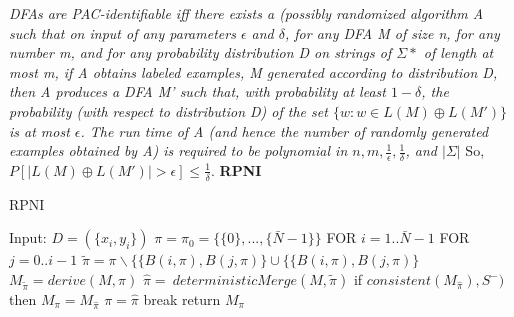 \documentclass[10pt,a4paper]{report}
\begin{document}
\textit{
DFAs are PAC-identifiable iff there exists a (possibly randomized algorithm A such that on input of any parameters $\epsilon$ and $\delta$, for any DFA M of size n, for any number m, and for any probability distribution D on strings of $\Sigma*$ of length at most m, if A obtains labeled examples, M generated according to distribution D, then A produces a DFA M' such that, with probability at least $1-\delta$, the probability (with respect to distribution D) of the set $\{w:w \in L(M) \oplus L(M') \}$ is at most $\epsilon$. The run time of A (and hence the number of randomly generated examples obtained by A) is required to be polynomial in $n, m, \frac{1}{\epsilon}, \frac{1}{\delta}$, and $|\Sigma|$ 
}
\newline
\newline
\indent So, $ P[ |L(M) \oplus L(M')| > \epsilon ] \leq \frac{1}{\delta}$.
\newpage
\textbf{RPNI}
\begin{algorithm}
\caption{RPNI}
	\begin{algorithmic}
	\STATE Input: $D = (\{x_i, y_i\})$
	\STATE $\pi = \pi_0 = \{\{0\}, ... , \{\bar{N} - 1 \}\}$
		\STATE FOR $i = 1 ..\bar{N} - 1$
			\STATE \indent FOR $j = 0 ..i - 1$
				\STATE \indent \indent $\tilde{\pi} = \pi \backslash  \{ \{B(i, \pi), B(j, \pi) \} \cup \{ \{B(i, \pi), B(j, \pi) \} $				
				\STATE \indent \indent $M_{\tilde{\pi}} = derive(M, \pi)$
				\STATE \indent \indent $\hat{\pi} = \ deterministicMerge(M, \tilde{\pi})$
				\STATE \indent \indent if $consistent(M_{\hat{\pi}}), S^-)$
				\STATE then
					\STATE \indent \indent \indent $M_{\pi} = M_{\hat{\pi}}$
					\STATE \indent \indent \indent $\pi = \hat{\pi}$	
					\STATE \indent \indent \indent break
	\STATE return $M_\pi$
	\end{algorithmic}
\end{algorithm}
\end{document}
